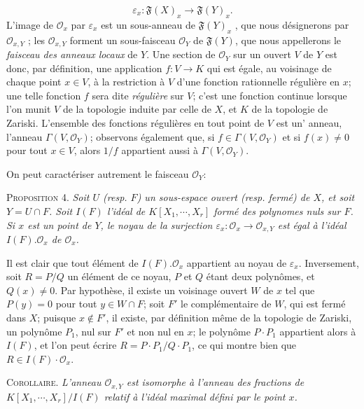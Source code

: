 \begin{equation*}
\varepsilon_x : \mathfrak{F}(X)_x \longrightarrow \mathfrak{F}(Y)_x .
\end{equation*}
L'image de $\mathcal{O}_x$ par $\varepsilon_x$ est un sous-anneau de $\mathfrak{F}(Y)_x$ , que nous désignerons par $\mathcal{O}_{x,Y}$ ; les $\mathcal{O}_{x,Y}$ forment un sous-faisceau $\mathcal{O}_Y$ de $\mathfrak{F}(Y)$, que nous appellerons le \textit{faisceau des anneaux locaux} de $Y$. Une section de $\mathcal{O}_Y$ sur un ouvert $V$ de $Y$ est donc, par définition, une application $f : V \to K$ qui est égale, au voisinage de chaque point $x \in V$, à la restriction à $V$ d'une fonction rationnelle régulière en $x$; une telle fonction $f$ sera dite \textit{régulière} sur $V$; c'est une fonction continue lorsque l'on munit $V$ de la topologie induite par celle de $X$, et $K$ de la topologie de Zariski. L'ensemble des fonctions régulières en tout point de $V$ est un' anneau, l'anneau $\Gamma(V, \mathcal{O}_Y)$; observons également que, si $f \in \Gamma(V, \mathcal{O}_Y)$ et si $f(x) \neq 0$ pour tout $x \in V$, alors $1/f$ appartient aussi à $\Gamma(V, \mathcal{O}_Y)$.



On peut caractériser autrement le faisceau $\mathcal{O}_Y$:

\textsc{Proposition 4.} \textit{Soit $U$ (resp. $F$) un sous-espace ouvert (resp. fermé) de $X$, et soit $Y = U \cap F$. Soit $I(F)$ l'idéal de $K[X_1, \cdots, X_r]$ formé des polynomes nuls sur $F$. Si $x$ est un point de $Y$, le noyau de la surjection $\varepsilon_x\colon \mathcal{O}_x \longrightarrow \mathcal{O}_{x,Y}$ est égal à l'idéal $I(F).\mathcal{O}_x$ de $\mathcal{O}_x$.}

Il est clair que tout élément de $I(F).\mathcal{O}_x$ appartient au noyau de $\varepsilon_x$. Inversement, soit $R = P/Q$ un élément de ce noyau, $P$ et $Q$ étant deux polynômes, et $Q(x) \neq 0$. Par hypothèse, il existe un voisinage ouvert $W$ de $x$ tel que $P(y) = 0$ pour tout $y \in W \cap F$; soit $F'$ le complémentaire de $W$, qui est fermé dans $X$; puisque $x \notin F'$, il existe, par définition même de la topologie de Zariski, un polynôme $P_1$, nul sur $F'$ et non nul en $x$; le polynôme $P \cdot P_1$ appartient alors à $I(F)$, et l'on peut écrire $R = P \cdot P_1/Q \cdot P_1$, ce qui montre bien que $R \in I(F) \cdot \mathcal{O}_x$.

\textsc{Corollaire.} \textit{L'anneau $\mathcal{O}_{x,Y}$ est isomorphe à l'anneau des fractions de $K[X_1, \cdots, X_r]/I(F)$ relatif à l'idéal maximal défini par le point $x$.}


